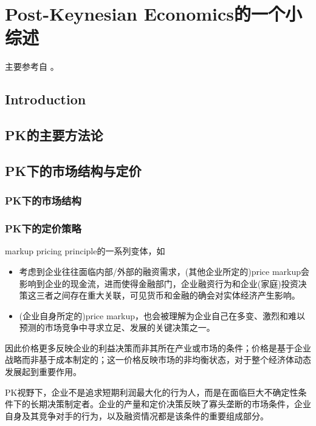 \chapter{Post-Keynesian Economics的一个小综述}
\label{sec:PK-user-guide}

主要参考自
\cite{Hart:2015bs}。

\section{Introduction}
\label{sec:PK-intro}

\section{PK的主要方法论}
\label{sec:PK-metho}

\section{PK下的市场结构与定价}
\label{sec:PK-mkt-struc-pricing-decision}

\subsection{PK下的市场结构}
\label{sec:PK-mkt-struc}

\subsection{PK下的定价策略}
\label{sec:PK-pricing-decision}
markup pricing principle的一系列变体，如
\begin{itemize}
\item\cite{Kalecki:1937ks}考虑到企业往往面临内部/外部的融资需求，(其他企业所定的)price markup会影响到企业的现金流，进而使得金融部门，企业融资行为和企业(家庭)投资决策这三者之间存在重大关联，可见货币和金融的确会对实体经济产生影响\citep{Ball:1964vi, Eichner:1973jc,Wood:1975vn, Harcourt:1976kp}。
\item (企业自身所定的)price markup，也会被理解为企业自己在多变、激烈和难以预测的市场竞争中寻求立足、发展的关键决策之一。
\end{itemize}
因此价格更多反映企业的利益决策而非其所在产业或市场的条件；价格是基于企业战略而非基于成本制定的；这一价格反映市场的非均衡状态，对于整个经济体动态发展起到重要作用。

PK视野下，企业不是追求短期利润最大化的行为人，而是在面临巨大不确定性条件下的长期决策制定者。企业的产量和定价决策反映了寡头垄断的市场条件，企业自身及其竞争对手的行为，以及融资情况都是该条件的重要组成部分。


